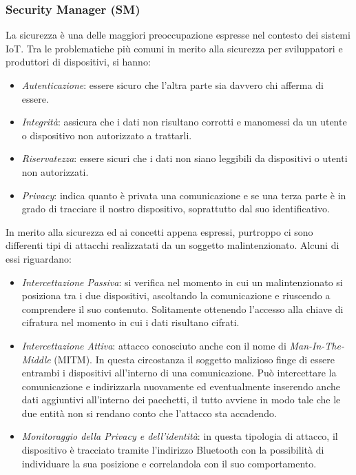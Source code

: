 \subsubsection{Security Manager (SM)}
La sicurezza è una delle maggiori preoccupazione espresse nel contesto dei sistemi IoT. Tra le problematiche più comuni in merito alla sicurezza per sviluppatori e produttori di dispositivi, si hanno:
\begin{itemize}
    \item \textit{Autenticazione}: essere sicuro che l'altra parte sia davvero chi afferma di essere.
    \item \textit{Integrità}: assicura che i dati non risultano corrotti e manomessi da un utente o dispositivo non autorizzato a trattarli.
    \item \textit{Riservatezza}: essere sicuri che i dati non siano leggibili da dispositivi o utenti non autorizzati.
    \item \textit{Privacy}: indica quanto è privata una comunicazione e se una terza parte è in grado di tracciare il nostro dispositivo, soprattutto dal suo identificativo.
\end{itemize}
In merito alla sicurezza ed ai concetti appena espressi, purtroppo ci sono differenti tipi di attacchi realizzatati da un soggetto malintenzionato. Alcuni di essi riguardano:
\begin{itemize}
    \item \textit{Intercettazione Passiva}: si verifica nel momento in cui un malintenzionato si posiziona tra i due dispositivi, ascoltando la comunicazione e riuscendo a comprendere il suo contenuto. Solitamente ottenendo l'accesso alla chiave di cifratura nel momento in cui i dati risultano cifrati.
    \item \textit{Intercettazione Attiva}: attacco conosciuto anche con il nome di \textit{Man-In-The-Middle} (MITM). In questa circostanza il soggetto malizioso finge di essere entrambi i dispositivi all'interno di una comunicazione. Può intercettare la comunicazione e indirizzarla nuovamente ed eventualmente inserendo anche dati aggiuntivi all'interno dei pacchetti, il tutto avviene in modo tale che le due entità non si rendano conto che l'attacco sta accadendo.
    \item \textit{Monitoraggio della Privacy e dell'identità}: in questa tipologia di attacco, il dispositivo è tracciato tramite l'indirizzo Bluetooth con la possibilità di individuare la sua posizione e correlandola con il suo comportamento.
\end{itemize}

